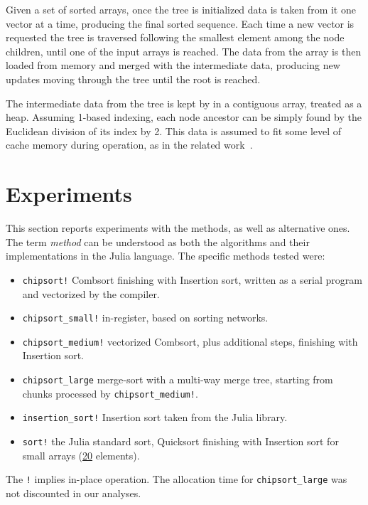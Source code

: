 \documentclass{juliacon}
\begin{document}
Given a set of sorted arrays, once the tree is initialized data is taken from it one vector at a time, producing the final sorted sequence. Each time a new vector is requested the tree is traversed following the smallest element among the node children, until one of the input arrays is reached. The data from the array is then loaded from memory and merged with the intermediate data, producing new updates moving through the tree until the root is reached.

The intermediate data from the tree is kept by \chipsort in a contiguous array, treated as a heap. Assuming 1-based indexing, each node ancestor can be simply found by the Euclidean division of its index by 2. This data is assumed to fit some level of cache memory during operation, as in the related work~\cite{DBLP:conf/IEEEpact/InoueMKN07,DBLP:journals/pvldb/ChhuganiNLMHCBKD08,DBLP:journals/pvldb/InoueT15}.


\section{Experiments}
\label{sec:experiments}
%
This section reports experiments with the \chipsort methods, as well as alternative ones. The term {\it method} can be understood as both the algorithms and their implementations in the Julia language. The specific methods tested were:
\begin{itemize}
\item {\tt chipsort!} Combsort finishing with Insertion sort, written as a serial program and vectorized by the compiler.
\item {\tt chipsort\_small!} in-register, based on sorting networks.
\item {\tt chipsort\_medium!} vectorized Combsort, plus additional steps, finishing with Insertion sort.
\item {\tt chipsort\_large} merge-sort with a multi-way merge tree, starting from chunks processed by {\tt chipsort\_medium!}.
\item {\tt insertion\_sort!} Insertion sort taken from the Julia library.
\item {\tt sort!} the Julia standard sort, Quicksort finishing with Insertion sort for small arrays (\href{https://github.com/JuliaLang/julia/blob/de3401908a506727ed70b3e953bd721ab4d66109/base/sort.jl#L461}{20} elements).
\end{itemize}

The {\tt !} implies in-place operation. The allocation time for {\tt chipsort\_large} was not discounted in our analyses.
\end{document}
